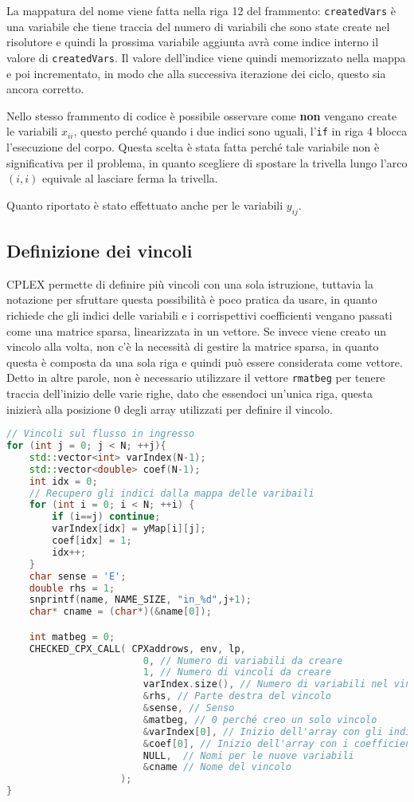 \noindent La mappatura del nome viene fatta nella riga 12 del frammento: \texttt{createdVars} è una variabile che tiene traccia del numero di variabili che sono state create nel risolutore e quindi la prossima variabile aggiunta avrà come indice interno il valore di \texttt{createdVars}. Il valore dell'indice viene quindi memorizzato nella mappa e poi incrementato, in modo che alla successiva iterazione dei ciclo, questo sia ancora corretto.

Nello stesso frammento di codice è possibile osservare come \textbf{non} vengano create le variabili $x_{ii}$, questo perché quando i due indici sono uguali, l'\texttt{if} in riga 4 blocca l'esecuzione del corpo. 
Questa scelta è stata fatta perché tale variabile non è significativa per il problema, in quanto scegliere di spostare la trivella lungo l'arco $(i,i)$ equivale al lasciare ferma la trivella.

Quanto riportato è stato effettuato anche per le variabili $y_{ij}$.

\subsection{Definizione dei vincoli}

CPLEX permette di definire più vincoli con una sola istruzione, tuttavia la notazione per sfruttare questa possibilità è poco pratica da usare, in quanto richiede che gli indici delle variabili e i corrispettivi coefficienti vengano passati come una matrice sparsa, linearizzata in un vettore.
Se invece viene creato un vincolo alla volta, non c'è la necessità di gestire la matrice sparsa, in quanto questa è composta da una sola riga e quindi può essere considerata come vettore. 
Detto in altre parole, non è necessario utilizzare il vettore \texttt{rmatbeg} per tenere traccia dell'inizio delle varie righe, dato che essendoci un'unica riga, questa inizierà alla posizione 0 degli array utilizzati per definire il vincolo.

\begin{lstlisting}[language=C++, caption=Esempio di creazione di una serie di vincoli]
// Vincoli sul flusso in ingresso
for (int j = 0; j < N; ++j){
	std::vector<int> varIndex(N-1);
	std::vector<double> coef(N-1);
	int idx = 0;
	// Recupero gli indici dalla mappa delle varibaili
	for (int i = 0; i < N; ++i) {
		if (i==j) continue;
		varIndex[idx] = yMap[i][j];
		coef[idx] = 1;
		idx++;
	}
	char sense = 'E';
	double rhs = 1;
	snprintf(name, NAME_SIZE, "in_%d",j+1);
	char* cname = (char*)(&name[0]);

	int matbeg = 0;
	CHECKED_CPX_CALL( CPXaddrows, env, lp, 
						0, // Numero di variabili da creare
						1, // Numero di vincoli da creare
						varIndex.size(), // Numero di variabili nel vincolo con coeff != 0
						&rhs, // Parte destra del vincolo
						&sense, // Senso
						&matbeg, // 0 perché creo un solo vincolo
						&varIndex[0], // Inizio dell'array con gli indici delle variabili
						&coef[0], // Inizio dell'array con i coefficienti delle variabili
						NULL,  // Nomi per le nuove variabili
						&cname // Nome del vincolo
					);
}
\end{lstlisting}

